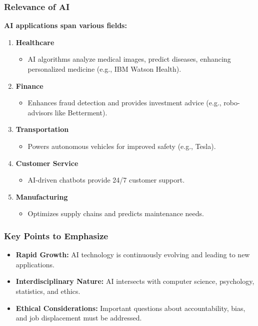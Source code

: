 \documentclass[aspectratio=169]{beamer}
\begin{document}
\begin{frame}[fragile]
    \frametitle{Relevance of AI}
    \textbf{AI applications span various fields:}
    \begin{enumerate}
        \item \textbf{Healthcare}
            \begin{itemize}
                \item AI algorithms analyze medical images, predict diseases, enhancing personalized medicine (e.g., IBM Watson Health).
            \end{itemize}
        \item \textbf{Finance}
            \begin{itemize}
                \item Enhances fraud detection and provides investment advice (e.g., robo-advisors like Betterment).
            \end{itemize}
        \item \textbf{Transportation}
            \begin{itemize}
                \item Powers autonomous vehicles for improved safety (e.g., Tesla).
            \end{itemize}
        \item \textbf{Customer Service}
            \begin{itemize}
                \item AI-driven chatbots provide 24/7 customer support.
            \end{itemize}
        \item \textbf{Manufacturing}
            \begin{itemize}
                \item Optimizes supply chains and predicts maintenance needs.
            \end{itemize}
    \end{enumerate}
\end{frame}

\begin{frame}[fragile]
    \frametitle{Key Points to Emphasize}
    \begin{itemize}
        \item \textbf{Rapid Growth:} AI technology is continuously evolving and leading to new applications.
        \item \textbf{Interdisciplinary Nature:} AI intersects with computer science, psychology, statistics, and ethics.
        \item \textbf{Ethical Considerations:} Important questions about accountability, bias, and job displacement must be addressed.
    \end{itemize}
\end{frame}
\end{document}
